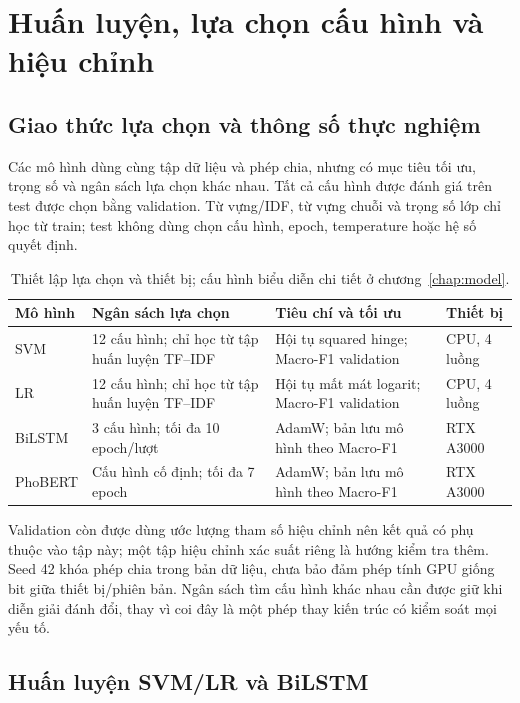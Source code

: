 \chapter{Huấn luyện, lựa chọn cấu hình và hiệu chỉnh}\label{chap:training}
\FloatBarrier
\section{Giao thức lựa chọn và thông số thực nghiệm}
Các mô hình dùng cùng tập dữ liệu và phép chia, nhưng có mục tiêu tối ưu, trọng số và ngân sách lựa chọn khác nhau. Tất cả cấu hình được đánh giá trên test được chọn bằng validation. Từ vựng/IDF, từ vựng chuỗi và trọng số lớp chỉ học từ train; test không dùng chọn cấu hình, epoch, temperature hoặc hệ số quyết định.
\begin{table}[htbp]\centering\small\caption{Thiết lập lựa chọn và thiết bị; cấu hình biểu diễn chi tiết ở chương~\ref{chap:model}.}\label{tab:training_protocol}
\begin{tabularx}{\linewidth}{lXXl}\toprule Mô hình & Ngân sách lựa chọn & Tiêu chí và tối ưu & Thiết bị\\\midrule
SVM & 12 cấu hình; chỉ học từ tập huấn luyện TF--IDF & Hội tụ squared hinge; Macro-F1 validation & CPU, 4 luồng\\
LR & 12 cấu hình; chỉ học từ tập huấn luyện TF--IDF & Hội tụ mất mát logarit; Macro-F1 validation & CPU, 4 luồng\\
BiLSTM & 3 cấu hình; tối đa 10 epoch/lượt & AdamW; bản lưu mô hình theo Macro-F1 & RTX A3000\\
PhoBERT & Cấu hình cố định; tối đa 7 epoch & AdamW; bản lưu mô hình theo Macro-F1 & RTX A3000\\\bottomrule
\end{tabularx}\end{table}
Validation còn được dùng ước lượng tham số hiệu chỉnh nên kết quả có phụ thuộc vào tập này; một tập hiệu chỉnh xác suất riêng là hướng kiểm tra thêm. Seed 42 khóa phép chia trong bản dữ liệu, chưa bảo đảm phép tính GPU giống bit giữa thiết bị/phiên bản. Ngân sách tìm cấu hình khác nhau cần được giữ khi diễn giải đánh đổi, thay vì coi đây là một phép thay kiến trúc có kiểm soát mọi yếu tố.

\FloatBarrier
\section{Huấn luyện SVM/LR và BiLSTM}




